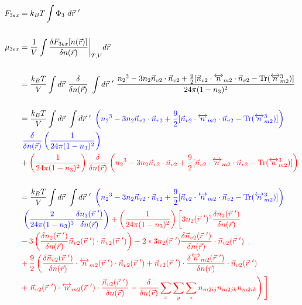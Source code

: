 \documentclass[double,12pt]{revtex4-2}
\begin{document}
\begin{align}
  F_{3ex} &= k_BT\int \Phi_3 ~d\vec r~'  \\ 
  \nonumber\\ 
  \mu_{3ex} &= \frac{1}{V}\int \frac{\delta F_{3ex}[n(\vec r)]}{\delta n(\vec r)}
  \bigg|_{T,V} d\vec r \\ \nonumber \\
%
   &= \frac{k_BT}{V}\int d\vec r~\frac{\delta}{\delta n(\vec r)}~\int 
   d\vec r~'~\frac{{n_2}^3-3n_2\vec{n}_{v2}\cdot\vec{n}_{v2}+\frac{9}{2}
    [\vec{n}_{v2}\cdot{\overleftrightarrow{n}_{m2}}\cdot{\vec{n}_{v2}}
    -\operatorname{Tr}({\overleftrightarrow{n}^3_{m2}})]}{24\pi(1-n_3)^2}
     \nonumber \\ \\
%
     &=\frac{k_BT}{V}\int d\vec r~\int d\vec r~'~ \color{blue}\left( {n_2}^3-3n_2
     \vec{n}_{v2}\cdot\vec{n}_{v2} 
     +\frac{9}{2}[\vec{n}_{v2}\cdot{\overleftrightarrow{n}_{m2}}\cdot{
     \vec{n}_{v2}}-\operatorname{Tr}({\overleftrightarrow{n}^3_{m2}})]
     \right) \nonumber\\
      &~\color{blue} \frac{\delta}{\delta n(\vec r)}\left(\frac{1}{24\pi(1-n_3)^2}
      \right) \nonumber\\
     &+ \color{red}\left(\frac{1}{24\pi(1-n_3)^2}\right)\frac{\delta}
     {\delta n(\vec r)}\left({n_2}^3-3n_2\vec{n}_{v2}\cdot\vec{n}_{v2}
     +\frac{9}{2}[\vec{n}_{v2}\cdot{\overleftrightarrow{n}_{m2}}\cdot{
     \vec{n}_{v2}}-\operatorname{Tr}({\overleftrightarrow{n}^3_{m2}})]
     \right) \\ \nonumber \\
%
    &=\frac{k_BT}{V}\int d\vec r~\int d\vec r~'~\color{blue}\left( {n_2}^3-3n_2
    \vec{n}_{v2}\cdot\vec{n}_{v2} 
     +\frac{9}{2}[\vec{n}_{v2}\cdot{\overleftrightarrow{n}_{m2}}\cdot{
     \vec{n}_{v2}}-\operatorname{Tr}({\overleftrightarrow{n}^3_{m2}})]
     \right) \nonumber\\
     &~\color{blue}\left(\frac{2}{24\pi(1-n_3)^3}\frac{\delta n_3(\vec r~')}{\delta n(\vec r)}
     \right) 
     \color{red}
     + \left(\frac{1}{24\pi(1-n_3)^2}\right)\left[3n_2(\vec r~')^2
     \frac{\delta n_2(\vec r~')}{\delta n(\vec r)} \right.
      \nonumber\\
     &\color{red} - 3\left(\frac{\delta n_{2}(\vec r~')}{\delta n(\vec r)}\vec n_{v2}
     (\vec r~') \cdot \vec n_{v2}(\vec r~')\right) - 2*3n_2(\vec r~')\frac{\delta
     \vec n_{v2}(\vec r~')}{\delta n(\vec r)}\cdot \vec n_{v2}(\vec r~') 
     \nonumber\\
     &\color{red}+\frac{9}{2}\left(\frac{\delta \vec n_{v2}(\vec r~')}{\delta n(\vec r)}
     \cdot \overleftrightarrow n_{m2}(\vec r~')\cdot \vec n_{v2}( \vec r~')
     +\vec n_{v2}(\vec r~')\cdot \frac{\delta \overleftrightarrow n_{m2}
     (\vec r~')}{\delta n(\vec r)}\cdot \vec n_{v2}(\vec r~')\color{white}
     \right)\nonumber\\
     &\color{red}+ \left.\vec n_{v2}(\vec r~')\cdot 
     \overleftrightarrow n_{m2}(\vec r~')
     \cdot \frac{\vec n_{v2}(\vec r~')}{\delta n(\vec r)}-
     \frac{\delta}{\delta n(\vec r)}\sum_x\sum_y\sum_z n_{m2ij}n_{m2jk}
     n_{m2ik}\right)
     \Bigg]
\end{align}
\end{document}
